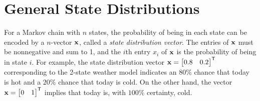 \section*{General State Distributions} %

\begin{comment} %
For an $n\times 1$ vector $\x$ with entries $x_i$ and an $n\times n$ matrix $A$ with entries $a_{ij}$, the \emph{1-norm} is defined as follows.
\begin{align*}
\|\x\|_1 = \sum_{i=1}^n|x_i| && \|A\|_1 = \sup_j \sum_{i=1}^n |a_{ij}|
\end{align*}
In other words, the $1$-norm for both vectors and matrices is the maximum absolute column sum.
Then if $A$ is a transition matrix, $\|A\|_1 = 1$, since each of the entries of the matrix are positive and each of the columns sum to $1$ by definition.
The power method with the 1-norm can be used to find the unique stable steady state distribution of $A$.
\end{comment}

For a Markov chain with $n$ states, the probability of being in each state can be encoded by a $n$-vector $\mathbf{x}$, called a \emph{state distribution vector}.
The entries of $\mathbf{x}$ must be nonnegative and sum to 1, and the $i$th entry $x_i$ of $\mathbf{x}$ is the probability of being in state $i$.
For example, the state distribution vector $\mathbf{x} = \begin{bmatrix}0.8 & 0.2\end{bmatrix}^{\mathsf T}$ corresponding to the 2-state weather model indicates an $80\%$ chance that today is hot and a $20\%$ chance that today is cold.
On the other hand, the vector $\mathbf{x} = \begin{bmatrix}0 & 1\end{bmatrix}^{\mathsf T}$ implies that today is, with $100\%$ certainty, cold.

